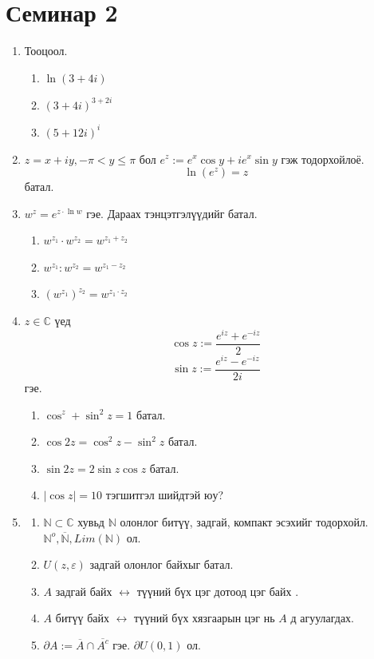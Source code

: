 \section{Семинар 2}
\begin{enumerate}
    \item Тооцоол.
    \begin{enumerate}
        \item $\ln(3+4i)$
        \item $(3+4i)^{3+2i}$
        \item $(5+12i)^i$
    \end{enumerate}
     \item $z=x+iy , -\pi<y\leq \pi$ бол $e^z:=e^x\cos y+ie^x\sin y$ гэж тодорхойлоё. $$\ln(e^z)=z$$ батал.
   \item  $w^z=e^{z\cdot\ln w}$ гэе. Дараах тэнцэтгэлүүдийг батал.
   \begin{enumerate}
        \item $w^{z_1}\cdot w^{z_2}=w^{z_1+z_2}$
        \item $w^{z_1}: w^{z_2}=w^{z_1-z_2}$
        \item $(w^{z_1})^{z_2}=w^{z_1\cdot z_2}$
    \end{enumerate}
     \item $z\in\mathbb{C}$ үед $$\cos z:=\dfrac{e^{iz}+e^{-iz}}{2}$$
     $$\sin z:=\dfrac{e^{iz}-e^{-iz}}{2i}$$ гэе.
    \begin{enumerate}
        \item $\cos^z+\sin^2 z=1$ батал.
        \item $\cos 2z=\cos^2 z-\sin^2 z$ батал.
        \item $\sin 2z=2\sin z\cos z$ батал.
        \item $|\cos z|=10$  тэгшитгэл шийдтэй юу?
    \end{enumerate}
     \item 
    \begin{enumerate}
        \item $\mathbb{N}\subset\mathbb{C}$ хувьд $\mathbb{N}$ олонлог битүү, задгай, компакт эсэхийг тодорхойл. $\mathbb{N}^{o}, \overline{\mathbb{N}} , Lim(\mathbb{N})$ ол.
        \item $U(z,\varepsilon)$ задгай олонлог байхыг батал.
        \item $A$ задгай байх $\longleftrightarrow$ түүний бүх цэг дотоод цэг байх .
         \item $A$ битүү байх $\longleftrightarrow$ түүний бүх хязгаарын цэг нь $A$ д агуулагдах.
         \item $\partial A:=\overline{A}\cap\overline{A^c}$ гэе. $\partial U(0,1)$ ол.
    \end{enumerate}
\end{enumerate}

